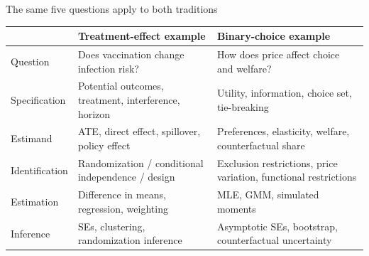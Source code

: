 \documentclass[aspectratio=169,11pt]{beamer}
\begin{document}
\begin{frame}{The same five questions apply to both traditions}

\small
\setlength{\tabcolsep}{4pt}
\renewcommand{\arraystretch}{1.1}

\begin{tabular}{L{0.18\textwidth} L{0.38\textwidth} L{0.38\textwidth}}
\toprule
&
\textbf{Treatment-effect example}
&
\textbf{Binary-choice example}
\\
\midrule

Question
&
Does vaccination change infection risk?
&
How does price affect choice and welfare?
\\[0.5em]

Specification
&
Potential outcomes, treatment, interference, horizon
&
Utility, information, choice set, tie-breaking
\\[0.5em]

Estimand
&
ATE, direct effect, spillover, policy effect
&
Preferences, elasticity, welfare, counterfactual share
\\[0.5em]

Identification
&
Randomization / conditional independence / design
&
Exclusion restrictions, price variation, functional restrictions
\\[0.5em]

Estimation
&
Difference in means, regression, weighting
&
MLE, GMM, simulated moments
\\[0.5em]

Inference
&
SEs, clustering, randomization inference
&
Asymptotic SEs, bootstrap, counterfactual uncertainty
\\
\bottomrule
\end{tabular}

\end{frame}
\end{document}
